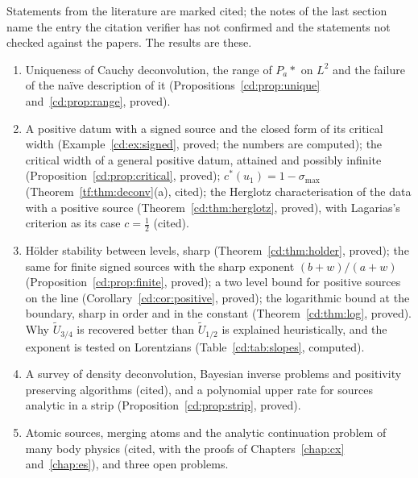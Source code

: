 Statements from the literature are marked cited; the notes of the last section name the entry the citation verifier has not confirmed and the statements not checked against the papers. The results are these.
\begin{enumerate}
\item Uniqueness of Cauchy deconvolution, the range of $P_a*$ on $L^2$ and the failure of the na\"ive description of it (Propositions~\ref{cd:prop:unique} and~\ref{cd:prop:range}, proved).
\item A positive datum with a signed source and the closed form of its critical width (Example~\ref{cd:ex:signed}, proved; the numbers are computed); the critical width of a general positive datum, attained and possibly infinite (Proposition~\ref{cd:prop:critical}, proved); $c^*(u_1)=1-\sigma_{\max}$ (Theorem~\ref{tf:thm:deconv}(a), cited); the Herglotz characterisation of the data with a positive source (Theorem~\ref{cd:thm:herglotz}, proved), with Lagarias's criterion as its case $c=\tfrac12$ (cited).
\item H\"older stability between levels, sharp (Theorem~\ref{cd:thm:holder}, proved); the same for finite signed sources with the sharp exponent $(b+w)/(a+w)$ (Proposition~\ref{cd:prop:finite}, proved); a two level bound for positive sources on the line (Corollary~\ref{cd:cor:positive}, proved); the logarithmic bound at the boundary, sharp in order and in the constant (Theorem~\ref{cd:thm:log}, proved). Why $\widetilde U_{3/4}$ is recovered better than $\widetilde U_{1/2}$ is explained heuristically, and the exponent is tested on Lorentzians (Table~\ref{cd:tab:slopes}, computed).
\item A survey of density deconvolution, Bayesian inverse problems and positivity preserving algorithms (cited), and a polynomial upper rate for sources analytic in a strip (Proposition~\ref{cd:prop:strip}, proved).
\item Atomic sources, merging atoms and the analytic continuation problem of many body physics (cited, with the proofs of Chapters~\ref{chap:cx} and~\ref{chap:es}), and three open problems.
\end{enumerate}
